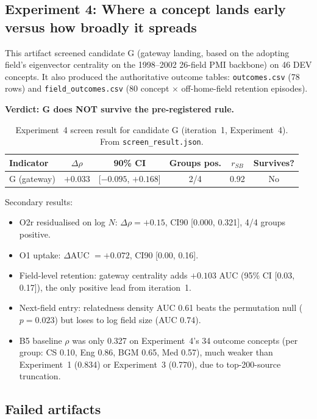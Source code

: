 \documentclass[11pt,letterpaper]{article}
\begin{document}
\subsection{Experiment 4: Where a concept lands early versus how broadly it spreads}

This artifact screened candidate G (gateway landing, based on the adopting field's eigenvector centrality on the 1998--2002 26-field PMI backbone) on 46 DEV concepts. It also produced the authoritative outcome tables: \texttt{outcomes.csv} (78 rows) and \texttt{field\_outcomes.csv} (80 concept $\times$ off-home-field retention episodes).

\textbf{Verdict: G does NOT survive the pre-registered rule.}

\begin{table}[!htbp]
\centering
\caption{Experiment~4 screen result for candidate G (iteration~1, Experiment~4). From \texttt{screen\_result.json}.}
\label{tab:exp4_screen}
\small
\begin{tabular}{lccccc}
\toprule
Indicator & $\Delta\rho$ & 90\% CI & Groups pos. & $r_{SB}$ & Survives? \\
\midrule
G (gateway) & $+0.033$ & [$-0.095$, $+0.168$] & 2/4 & 0.92 & No \\
\bottomrule
\end{tabular}
\end{table}

Secondary results:
\begin{itemize}
    \item O2r residualised on log $N$: $\Delta\rho = +0.15$, CI90 [0.000, 0.321], 4/4 groups positive.
    \item O1 uptake: $\Delta$AUC $= +0.072$, CI90 [0.00, 0.16].
    \item Field-level retention: gateway centrality adds $+0.103$ AUC (95\% CI [0.03, 0.17]), the only positive lead from iteration~1.
    \item Next-field entry: relatedness density AUC 0.61 beats the permutation null ($p = 0.023$) but loses to log field size (AUC 0.74).
    \item B5 baseline $\rho$ was only 0.327 on Experiment~4's 34 outcome concepts (per group: CS 0.10, Eng 0.86, BGM 0.65, Med 0.57), much weaker than Experiment~1 (0.834) or Experiment~3 (0.770), due to top-200-source truncation.
\end{itemize}

\subsection{Failed artifacts}
\end{document}
